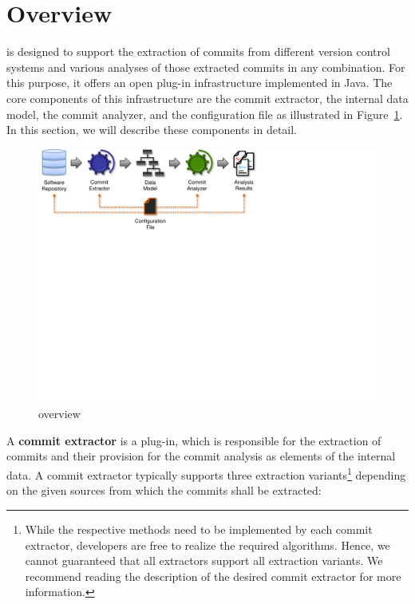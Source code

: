 \section{Overview}
\label{sec:Overview}
\thetool{} is designed to support the extraction of commits from different version control systems and various analyses of those extracted commits in any combination. For this purpose, it offers an open plug-in infrastructure implemented in Java. The core components of this infrastructure are the commit extractor, the internal data model, the commit analyzer, and the configuration file as illustrated in Figure~\ref{fig:Overview}. In this section, we will describe these components in detail.

\begin{figure}[h] %
	\centering
		\includegraphics[width=\columnwidth,trim={0,2cm 13cm 9cm 0cm},clip]{inserts/comani_overview.pdf}
  \caption{\thetool{} overview}
	\label{fig:Overview}
\end{figure}

A \textbf{commit extractor} is a \thetool{} plug-in, which is responsible for the extraction of commits and their provision for the commit analysis as elements of the internal data. A commit extractor typically supports three extraction variants\footnote{While the respective methods need to be implemented by each commit extractor, developers are free to realize the required algorithms. Hence, we cannot guaranteed that all extractors support all extraction variants. We recommend reading the description of the desired commit extractor for more information.} depending on the given sources from which the commits shall be extracted:

